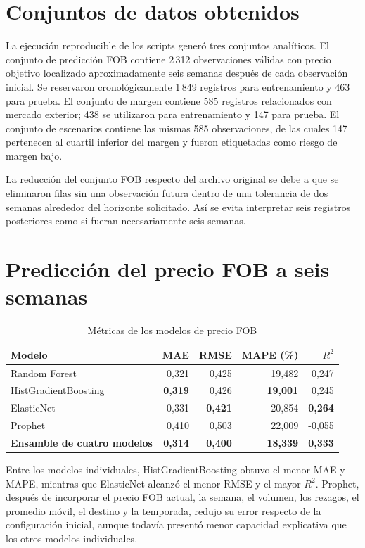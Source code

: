 \section{Conjuntos de datos obtenidos}

La ejecución reproducible de los scripts generó tres conjuntos analíticos. El conjunto de predicción FOB contiene 2\,312 observaciones válidas con precio objetivo localizado aproximadamente seis semanas después de cada observación inicial. Se reservaron cronológicamente 1\,849 registros para entrenamiento y 463 para prueba. El conjunto de margen contiene 585 registros relacionados con mercado exterior; 438 se utilizaron para entrenamiento y 147 para prueba. El conjunto de escenarios contiene las mismas 585 observaciones, de las cuales 147 pertenecen al cuartil inferior del margen y fueron etiquetadas como riesgo de margen bajo.

La reducción del conjunto FOB respecto del archivo original se debe a que se eliminaron filas sin una observación futura dentro de una tolerancia de dos semanas alrededor del horizonte solicitado. Así se evita interpretar seis registros posteriores como si fueran necesariamente seis semanas.

\section{Predicción del precio FOB a seis semanas}

\begin{table}[H]
\centering
\caption{Métricas de los modelos de precio FOB}
\label{tab:resultados_fob}
\small
\begin{tabular}{lrrrr}
\toprule
\textbf{Modelo} & \textbf{MAE} & \textbf{RMSE} & \textbf{MAPE (\%)} & \textbf{$R^2$} \\
\midrule
Random Forest & 0,321 & 0,425 & 19,482 & 0,247 \\
HistGradientBoosting & \textbf{0,319} & 0,426 & \textbf{19,001} & 0,245 \\
ElasticNet & 0,331 & \textbf{0,421} & 20,854 & \textbf{0,264} \\
Prophet & 0,410 & 0,503 & 22,009 & -0,055 \\
\textbf{Ensamble de cuatro modelos} & \textbf{0,314} & \textbf{0,400} & \textbf{18,339} & \textbf{0,333} \\
\bottomrule
\end{tabular}
\end{table}

Entre los modelos individuales, HistGradientBoosting obtuvo el menor MAE y MAPE, mientras que ElasticNet alcanzó el menor RMSE y el mayor $R^2$. Prophet, después de incorporar el precio FOB actual, la semana, el volumen, los rezagos, el promedio móvil, el destino y la temporada, redujo su error respecto de la configuración inicial, aunque todavía presentó menor capacidad explicativa que los otros modelos individuales.

